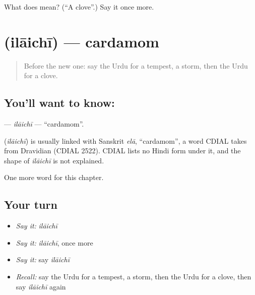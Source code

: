 \begin{tcolorbox}[breakable,colback=teal!4,colframe=teal!35!black,title={Before you move on}]
What does  mean? (\textquotedblleft{}A clove\textquotedblright{}.) Say it once more.
\end{tcolorbox}
\section[\texorpdfstring{\ur{الائچی} (ilāichī)}{الائچی (ilāichī)}]{ (ilāichī) — cardamom}

\label{lesson:UR-C207-ilaichi}



\begin{quote}
Before the new one: say the Urdu for a tempest, a storm, then the Urdu for a clove.
\end{quote}

\subsection*{You'll want to know: }
\textbf{} — \emph{ilāichī} — \textquotedblleft{}cardamom\textquotedblright{}.

\begin{cousinweb}
\textbf{} (\emph{ilāichī}) is usually linked with Sanskrit \emph{elā}, \textquotedblleft{}cardamom\textquotedblright{}, a word CDIAL takes from Dravidian (CDIAL 2522). CDIAL lists no Hindi form under it, and the shape of \emph{ilāichī} is not explained.
\end{cousinweb}

\begin{grammarlens}[title={What you've built}]
One more word for this chapter.
\end{grammarlens}

\subsection*{Your turn}
\begin{itemize}
\raggedright
  \item \emph{Say it:} \emph{ilāichī}
  \item \emph{Say it:} \emph{ilāichī}, once more
  \item \emph{Say it:} say \emph{ilāichī}
  \item \emph{Recall:} say the Urdu for a tempest, a storm, then the Urdu for a clove, then say \emph{ilāichī} again
\end{itemize}

